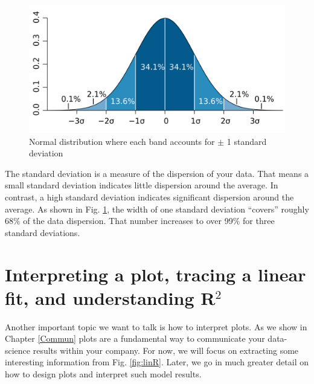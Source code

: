 \begin{figure}[h]
	\begin{center}
			\includegraphics[scale=0.13]{Parts/basics/stdch2}
	\end{center}
	\caption{Normal distribution where each band accounts for $\pm$ 1 standard deviation}
	\label{fig:std}
\end{figure} 

\newpage

The standard deviation is a measure of the dispersion of your data. That means a small standard deviation indicates little dispersion around the average. In contrast, a high standard deviation indicates significant dispersion around the average. As shown in Fig. \ref{fig:std}, the width of one standard deviation ``covers'' roughly 68$\%$ of the data dispersion. That number increases to over 99$\%$ for three standard deviations.

\section{Interpreting a plot, tracing a linear fit, and understanding R$^2$}

Another important topic we want to talk is how to interpret plots. As we show in Chapter \ref{Commun} plots are a fundamental way to communicate your data-science results within your company. For now, we will focus on extracting some interesting information from Fig. \ref{fig:linR}. Later, we go in much greater detail on how to design plots and interpret such model results.

